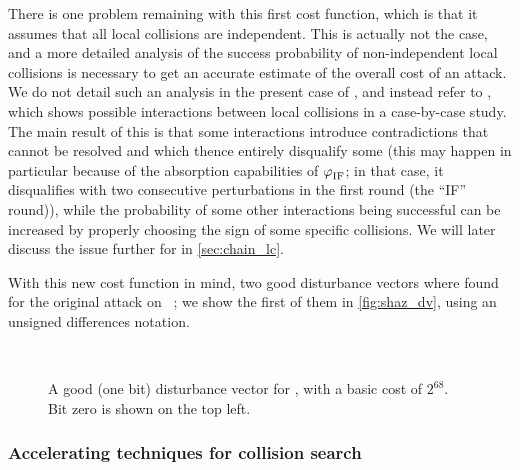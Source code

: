 There is one problem remaining with this first cost function, which is that it assumes that all local collisions are independent. This is actually not the case, and a more detailed analysis of
the success probability of non-independent local collisions is necessary to get an accurate estimate of the overall cost of an attack. We do not detail such an analysis in the present case
of \shazero, and instead refer to \cite[Chapter 5]{algocrypt}, which shows possible interactions between local collisions in a case-by-case study. The main result of this is that
some interactions introduce contradictions that cannot be resolved and which thence entirely disqualify some \dvs (this may happen in particular because of the absorption capabilities
of $\operatorname{\varphi}_\text{IF}$; in that case, it disqualifies \dvs with two consecutive perturbations in the first round (the ``IF'' round)),
while the probability of some other interactions being successful can be increased by properly choosing the sign of some specific collisions. We will later discuss
the issue further for \shaone in \autoref{sec:chain_lc}.

With this new cost function in mind, two good disturbance vectors where found for the original attack on \shazero~\cite{DBLP:conf/crypto/ChabaudJ98}; we show the first of them in
\autoref{fig:shaz_dv}, using an unsigned differences notation.

\begin{figure}[ht]
\begin{center}
\nodiff \nodiff \nodiff \onediff \nodiff \nodiff \nodiff \nodiff \nodiff \nodiff \nodiff \onediff \nodiff \nodiff \onediff \nodiff \nodiff \nodiff \nodiff \nodiff
\nodiff \nodiff \onediff \nodiff \nodiff \nodiff \nodiff \onediff \onediff \nodiff \onediff \onediff \nodiff \onediff \onediff \onediff \onediff \onediff \onediff \nodiff\\

\onediff \onediff \nodiff \onediff \nodiff \nodiff \onediff \nodiff \nodiff \nodiff \nodiff \onediff \nodiff \onediff \nodiff \onediff \nodiff \nodiff \onediff \nodiff
\onediff \nodiff \onediff \nodiff \nodiff \nodiff \onediff \nodiff \onediff \onediff \onediff \nodiff \nodiff \onediff \onediff \nodiff \nodiff \nodiff \nodiff \nodiff
\end{center}
\caption{A good (one bit) disturbance vector for \shazero, with a basic cost of $2^{68}$. Bit zero is shown on the top left.\label{fig:shaz_dv}}
\end{figure}

\subsubsection{Accelerating techniques for collision search}
\label{sec:acc_techs_sha0}

